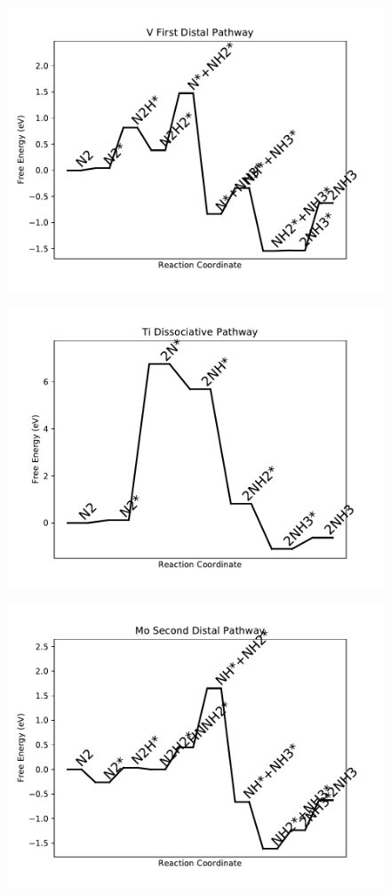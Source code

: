 \begin{figure}
\includegraphics[width=0.8\linewidth]{data/plots/V_distal_1.pdf}
\end{figure}

\begin{figure}
\includegraphics[width=0.8\linewidth]{data/plots/Ti_dissociative.pdf}
\end{figure}

\begin{figure}
\includegraphics[width=0.8\linewidth]{data/plots/Mo_distal_2.pdf}
\end{figure}

